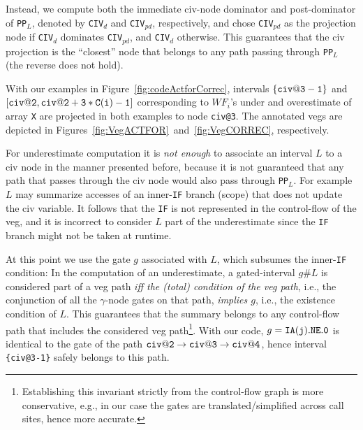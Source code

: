 \documentclass{sig-alternate}
\begin{document}
Instead, we compute both the immediate {\sc civ}-node dominator and 
post-dominator of {\tt PP$_L$}, denoted by {\tt CIV}$_{d}$ and 
{\tt CIV}$_{pd}$, respectively, and chose {\tt CIV}$_{pd}$
as the projection node if {\tt CIV}$_{d}$ dominates {\tt CIV}$_{pd}$, 
and {\tt CIV}$_{d}$ otherwise. This guarantees that the {\sc civ} projection
is the ``closest'' node that belongs to any path passing through {\tt PP$_L$}
(the reverse does not hold).

With our examples in Figure~\ref{fig:codeActforCorrec},
intervals $\{{\tt civ@3-1}\}$ and $[{\tt civ@2},{\tt civ@2+3*C(i)-1}]$ 
corresponding to $WF_i$'s  under and overestimate of array {\tt X} 
are projected in both examples to node {\tt civ@3}.
The annotated {\sc veg}s are depicted in 
Figures~\ref{fig:VegACTFOR}~and~\ref{fig:VegCORREC}, respectively.

For underestimate computation it is {\em not enough} to associate an interval $L$ 
to a {\sc civ} node in the manner presented before, because it is not guaranteed
that any path that passes through the {\sc civ} node would also pass through {\tt PP$_L$}.
For example $L$ may summarize accesses of an inner-{\tt IF} branch 
(scope) that does not update the {\sc civ} variable. It follows that the {\tt IF} 
is not represented in the control-flow of the {\sc veg}, and it is incorrect
to consider $L$ part of the underestimate since the {\tt IF} branch might not be 
taken at runtime.

At this point we use the gate $g$ associated with $L$, which subsumes the
inner-{\tt IF} condition: In the computation
of an underestimate, a gated-interval $g\#L$ is considered part of a 
{\sc veg} path {\em iff the (total) condition of the {\sc veg} path}, i.e., 
the conjunction of all the $\gamma$-node gates on that path, {\em implies $g$}, 
i.e., the existence condition of $L$.  This guarantees that the summary belongs
to any control-flow path that includes the considered {\sc veg} path\footnote{
Establishing this invariant strictly from the control-flow graph is more
conservative, e.g., in our case the gates are translated/simplified across call sites,
hence more accurate.
}.
With our code, $g={\tt IA(j).NE.0}$ is identical to the gate of the path 
${\tt civ@2}\rightarrow{\tt civ@3}\rightarrow{\tt civ@4}$,
hence interval {\tt \{civ@3-1\}} safely belongs to this path.
 
\end{document}
